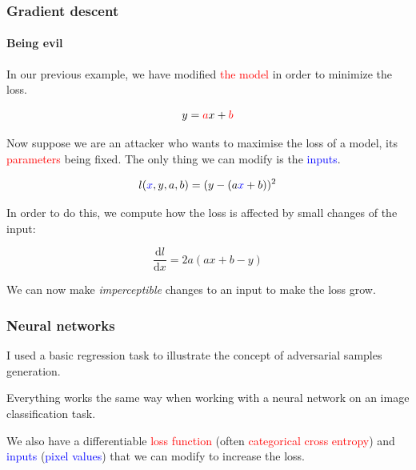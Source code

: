 \documentclass[9pt]{beamer}
\begin{document}
\begin{frame}
  \frametitle{Gradient descent}

  \framesubtitle{Being evil}

  \vspace{-0.5cm}

  \begin{center}
    \scalebox{0.5}{
      
    }
  \end{center}

  In our previous example, we have modified \textcolor{red}{the model}
  in order to minimize the loss.

  \[
  y = \textcolor{red}{a}x + \textcolor{red}{b}
  \]

  \pause

  Now suppose we are an attacker who wants to maximise the loss of a
  model, its \textcolor{red}{parameters} being fixed. The only thing
  we can modify is the \textcolor{blue}{inputs}.

  \[
  l(\textcolor{blue}{x}, y, a, b) = (y - (a \textcolor{blue}{x} + b))^{2}
  \]

  \pause

  In order to do this, we compute how the loss is affected by small
  changes of the input:

  \[
  \frac{\mathrm{d}l}{\mathrm{d}x} = 2 a (ax + b - y)
  \]

  We can now make \emph{imperceptible} changes to an input to make the
  loss grow.
\end{frame}

\begin{frame}
  \frametitle{Neural networks}

  I used a basic regression task to illustrate the concept of
  adversarial samples generation.

  \bigskip

  Everything works the same way when working with a neural network on
  an image classification task.

  \bigskip

  We also have a differentiable \textcolor{red}{loss function} (often
  \textcolor{red}{categorical cross entropy}) and
  \textcolor{blue}{inputs} (\textcolor{blue}{pixel values}) that we
  can modify to increase the loss.
\end{frame}
\end{document}

